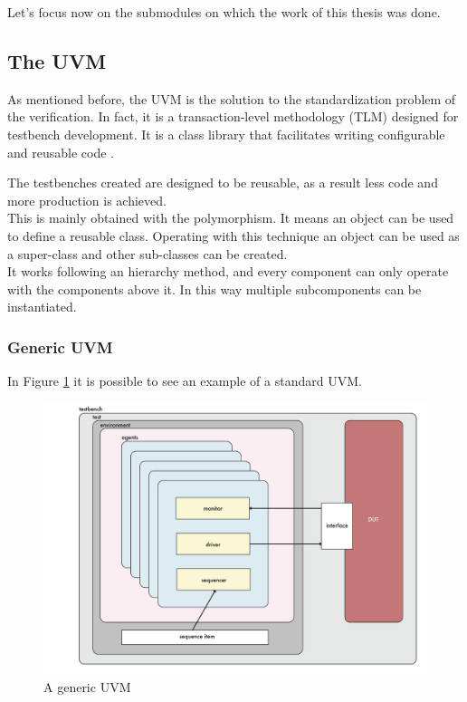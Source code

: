 Let's focus now on the submodules on which the work of this thesis was done.




\subsection{The UVM}
As mentioned before, the UVM is the solution to the standardization problem of the verification. In fact, it is a transaction-level methodology (TLM) designed for testbench development. It is a class library that facilitates writing configurable and reusable code \cite{verification-book-2018}.

The testbenches created are designed to be reusable, as a result less code and more production is achieved.\\

This is mainly obtained with the polymorphism. It means an object can be used to define a reusable class. Operating with this technique an object can be used as a super-class and other sub-classes can be created.\\

It works following an hierarchy method, and every component can only operate with the components above it. In this way multiple subcomponents can be instantiated.\\

\subsubsection{Generic UVM}
In Figure \ref{gen-uvm} it is possible to see an example of a standard UVM.

\begin{figure}[H]
    \centering
    \includegraphics[scale = 0.4]{Chapter_1/img/general-uvm.png}
    \caption{A generic UVM}
    \label{gen-uvm}
\end{figure}

